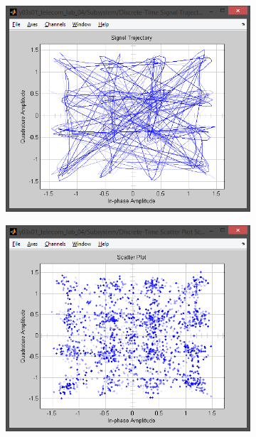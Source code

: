 \documentclass[
	a4paper,
	oneside,
	BCOR = 10mm,
	DIV = 12,
	12pt,
	headings = normal,
]{scrartcl}
\begin{document}
\begin{figure}[!htbp]
\begin{subfigure}{\textwidth / 3}
						\caption{}
						\label{subfig:rolloff-0p6-eye-out}
					\end{subfigure}%
					\begin{subfigure}{\textwidth / 3}
						\centering
						\includegraphics[height = 7\baselineskip]{../01-solution/rolloff-0p6-signal-trajectory-out.png}
						\caption{}
						\label{subfig:rolloff-0p6-signal-trajectory-out}
					\end{subfigure}%
					\begin{subfigure}{\textwidth / 3}
						\centering
						\includegraphics[height = 7\baselineskip]{../01-solution/rolloff-0p6-scatter-plot-out.png}

\end{subfigure}
\end{figure}
\end{document}
